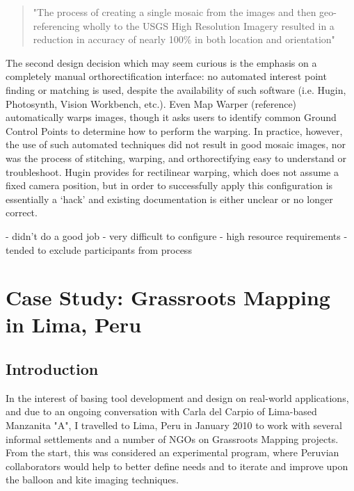 \documentclass[11pt]{report}
\begin{document}
\begin{quote}
"The process of creating a single mosaic from the images and then geo-referencing wholly to the USGS High Resolution Imagery resulted in a reduction in accuracy of nearly 100\% in both location and orientation"
\cite{wolf2006lowcost}
\end{quote}

The second design decision which may seem curious is the emphasis on a completely manual orthorectification interface: no automated interest point finding or matching is used, despite the availability of such software (i.e. Hugin, Photosynth, Vision Workbench, etc.). Even Map Warper (reference) automatically warps images, though it asks users to identify common Ground Control Points to determine how to perform the warping. In practice, however, the use of such automated techniques did not result in good mosaic images, nor was the process of stitching, warping, and orthorectifying easy to understand or troubleshoot. Hugin provides for rectilinear warping, which does not assume a fixed camera position, but in order to successfully apply this configuration is essentially a `hack' and existing documentation is either unclear or no longer correct.



- didn't do a good job
- very difficult to configure
- high resource requirements
- tended to exclude participants from process



\chapter{Case Study: Grassroots Mapping in Lima, Peru}
\label{chap:peru}

\section{Introduction}

In the interest of basing tool development and design on real-world applications, and due to an ongoing conversation with Carla del Carpio of Lima-based Manzanita "A", I travelled to Lima, Peru in January 2010 to work with several informal settlements and a number of NGOs on Grassroots Mapping projects. From the start, this was considered an experimental program, where Peruvian collaborators would help to better define needs and to iterate and improve upon the balloon and kite imaging techniques.
\end{document}
